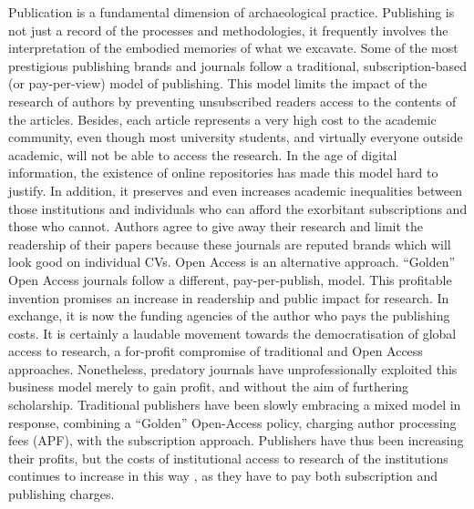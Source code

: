 		Publication is a fundamental dimension of archaeological practice. Publishing is not just a record of the processes and methodologies, it frequently involves the interpretation of the embodied memories of what we excavate. Some of the most prestigious publishing brands and journals follow a traditional, subscription-based (or pay-per-view) model of publishing. This model limits the impact of the research of authors by preventing unsubscribed readers access to the contents of the articles. Besides, each article represents a very high cost to the academic community, even though most university students, and virtually everyone outside academic, will not be able to access the research. In the age of digital information, the existence of online repositories has made this model hard to justify. In addition, it preserves and even increases academic inequalities between those institutions and individuals who can afford the exorbitant subscriptions and those who cannot. Authors agree to give away their research and limit the readership of their papers because these journals are reputed brands which will look good on individual CVs. Open Access is an alternative approach. “Golden” Open Access journals follow a different, pay-per-publish, model. This profitable invention promises an increase in readership and public impact for research. In exchange, it is now the funding agencies of the author who pays the publishing costs. It is certainly a laudable movement towards the democratisation of global access to research, a for-profit compromise of traditional and Open Access approaches. Nonetheless, predatory journals have unprofessionally exploited this business model merely to gain profit, and without the aim of furthering scholarship. Traditional publishers have been slowly embracing a mixed model in response, combining a “Golden” Open-Access policy, charging author processing fees (APF), with the subscription approach. Publishers have thus been increasing their profits, but the costs of institutional access to research of the institutions continues to increase in this way \parencite{Matthews_2015}, as they have to pay both subscription and publishing charges.
		
